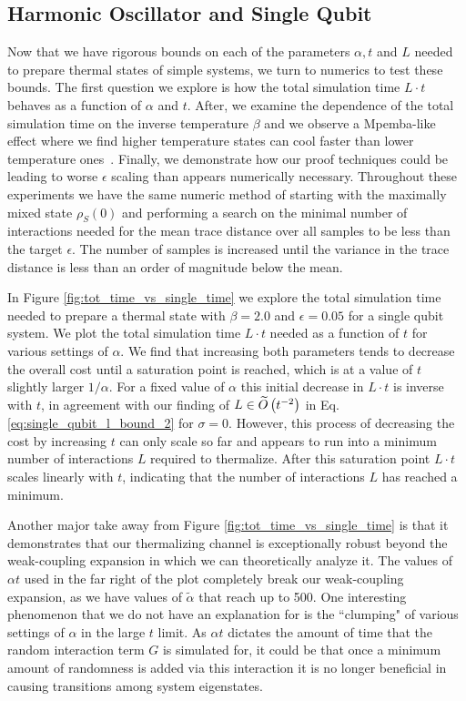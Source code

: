 \subsection{Harmonic Oscillator and Single Qubit} \label{sec:specific_numerics}
Now that we have rigorous bounds on each of the parameters $\alpha, t$ and $L$ needed to prepare thermal states of simple systems, we turn to numerics to test these bounds. The first question we explore is how the total simulation time $L \cdot t$ behaves as a function of $\alpha$ and $t$. After, we examine the dependence of the total simulation time on the inverse temperature $\beta$ and we observe a Mpemba-like effect where we find higher temperature states can cool faster than lower temperature ones~\cite{auerbach1995supercooling}. Finally, we demonstrate how our proof techniques could be leading to worse $\epsilon$ scaling than appears numerically necessary. Throughout these experiments we have the same numeric method of starting with the maximally mixed state $\rho_S(0)$ and performing a search on the minimal number of interactions needed for the mean trace distance over all samples to be less than the target $\epsilon$. The number of samples is increased until the variance in the trace distance is less than an order of magnitude below the mean.

In Figure \ref{fig:tot_time_vs_single_time} we explore the total simulation time needed to prepare a thermal state with $\beta = 2.0$ and $\epsilon = 0.05$ for a single qubit system. We plot the total simulation time $L \cdot t$ needed as a function of $t$ for various settings of $\alpha$. We find that increasing both parameters tends to decrease the overall cost until a saturation point is reached, which is at a value of $t$ slightly larger $1/\alpha$. For a fixed value of $\alpha$ this initial decrease in $L \cdot t$ is inverse with $t$, in agreement with our finding of $L \in \widetilde{O} \left( t^{-2} \right)$ in Eq. \eqref{eq:single_qubit_l_bound_2} for $\sigma = 0$. However, this process of decreasing the cost by increasing $t$ can only scale so far and appears to run into a minimum number of interactions $L$ required to thermalize. After this saturation point $L \cdot t$ scales linearly with $t$, indicating that the number of interactions $L$ has reached a minimum. 

Another major take away from Figure \ref{fig:tot_time_vs_single_time} is that it demonstrates that our thermalizing channel is exceptionally robust beyond the weak-coupling expansion in which we can theoretically analyze it. The values of $\alpha t$ used in the far right of the plot completely break our weak-coupling expansion, as we have values of $\widetilde{\alpha}$ that reach up to 500. One interesting phenomenon that we do not have an explanation for is the ``clumping" of various settings of $\alpha$ in the large $t$ limit. As $\alpha t$ dictates the amount of time that the random interaction term $G$ is simulated for, it could be that once a minimum amount of randomness is added via this interaction it is no longer beneficial in causing transitions among system eigenstates. 


